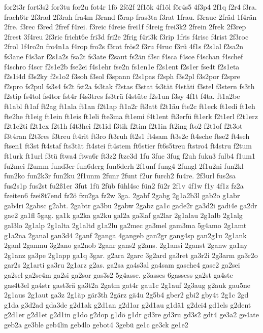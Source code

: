 {for2t3r
fort3s2
for3tu
for2u
fot4r
1fö
2fö2f
2f1ök
4f1öl
för4s5
4f3p4
2f1q
f2r4
f3ra.
frach6tr
2f3rad
2f3rah
fra4m
f3rand
f5rap
fras3ta
f3rat
1frau.
f3rauc
2fräd
1f4rän
2fre.
f3rec
f3red
2fref
f4rei.
f3reic
f4reie
frei1f
f4reig
frei3k2
2frein
2frek
2f3rep
2frest
3f4reu
2f3ric
fricht6e
fri3d
fri2e
2frig
f4ri3k
f3rip
1fris
f4risc
f4rist
2f3roc
2frol
1f4ro2n
fro4n1a
f4rop
fro2s
f3rot
frös2
f3ru
f4ruc
f3rü
4f1s
f2s1al
f2sa2n
fs3ane
f4s3ar
f2s1a2s
fsa2t
fs3ate
f2saut
fs2än
f3sc
f4sca
f4sce
f4schan
f4schef
f4schro
f4scr
f2s1e2b
fse2ei
f4s1ehr
fse2n
fs1en1e
f2s1ent
f2s1er
fse4t
f2s1eta
f2s1i4d
f3s2ky
f2s1o2
f3soh
f3sol
f3spann
f2s1pas
f2sph
f3s2pl
f3s2por
f2spre
f2spro
fs2pul
fs3s4
fs2t
fst2a
fs3tak
f2stas
f3stat
fs3tät
f4stäti
f3stel
f3stern
fs3th
f2stip
fs4tol
fs4tor
fst4r
f4s3tres
fs3trü
f4stüte
f2s1un
f3sy
4f1t
f4ta.
ft1a2be
ft1abl
ft1af
ft2ag
ft1ala
ft1an
f2t1ap
ft1a2r
ft3att
f2t1äu
fte2c
ft1eck
ft1edi
ft1eh
fte2he
ft1eig
ft1ein
ft1eis
ft1eli
fte3ma
ft1emi
f4t1ent
ft3erfü
ft1erk
f2t1erl
f2t1erz
f2t1e2ti
f2t1ex
f2t1h
f4t3hei
f2t1id
f3tik
f2tim
f2t1in
ft2ing
fto2
f2t1of
f2t3ot
f3t4ran
f2t3res
f3treu
ft4rit
ft3ro
ft3ruh
ft2s1
ft4sam
ft3s2c
ft4sche
ftse2
ft4seh
ftsen1
ft3st
ft4staf
fts3tät
ft4stei
ft4stem
ft6stier
ft6s5treu
ftstro4
ft4stru
f2tum
ft1urk
ft1url
f3tü
ftwa4
ftwa6r
ft3z2
ftze3d
1fu
3fuc
3fug
f2uh
fuku3
fulb4
f1um1
fu2mei
f2umm
fund3er
fun6derg
fun6derh
2f1unf
fung4
2fungl
2f1u2ni
fun2kl
fun2ko
fun2k3r
fun2ku
2f1unm
2funr
2funt
f2ur
furch2
fu4re.
2f3url
fus2sa
fus2s1p
fus2st
fu2ß1er
3fut
1fü
2füb
fühl4sc
fün2
fü2r
2f1v
4f1w
f1y
4f1z
fz2a
fzeiten6
fzei8t7end
fz2ö
fzu2ga
fz2w
3ga.
2gabf
2gabg
2g1a2b3l
gab2o
g1abr
gab4ri
2gabsc
g2abt.
2gabtr
ga3bu
2gabw
2gabz
ga1c
gade2r
ga3d2i
gadi4e
ga2dr
gae2
ga1fl
5gag.
ga1k
ga2ka
ga2ku
gal2a
ga3laf
ga2lar
2g1alau
2g1alb
2g1alg
gal3lo
2g1alp
2g1alta
2g1altd
g1a2lu
ga2mec
ga3mel
gam3ma
5g4amo
2g1amt
g1a2na
2ganal
gan3d4
2ganf
2ganga
4gangeb
gan2gr
gang4sp
gan2g1u
2g1ank
2ganl
2ganmu
3g2ano
ga2nob
2ganr
gans2
g2ans.
2g1ansi
2ganst
2ganw
ga1ny
2g1anz
ga3pe
2g1app
ga1q
3gar.
g2ara
2garc
3g2ard
ga3ret
ga3r2i
2g3arm
ga3r2o
gar2s
2g1arti
ga3ru
2g1arz
g2as.
ga2sa
ga4s3al
ga4sam
gasche4
gase2
ga2sei
ga2sel
ga2se4m
ga2si
ga2sor
gas3s2
5g4asse.
g3asses
6gassess
ga2st
ga4ste
gas4t3el
ga4str
gast3rä
ga3t2a
2gatm
gat4r
gau1c
2g1auf
2g3aug
g2auk
gau5ne
2g1aus
2g1aut
ga3z
2g1äp
gär3th
2gärz
gä4u
2g5b4
gber2
gbi2
gby4t
2g1c
2gd
g1da
g3d2ad
gda3de
g2d1ak
g2d1an
g2d1ar
g2d1au
g1dä1
g2dei4
gd1els
g2dent
g2d1er
g2d1et
g2d1in
g1do
g2dop
g1dö
g1dr
gd3re
gd3ru
gd3s2
gdt4
ge3a2
ge4ate
geb2a
ge3ble
geb4lin
geb4lo
gebot4
3gebü
ge1c
ge3ck
ge1e2
}
